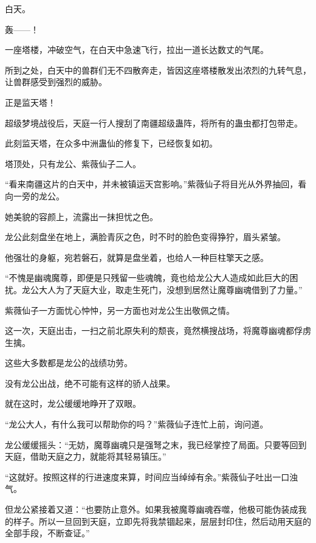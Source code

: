 
\begin{this_body}



白天。

轰——！

一座塔楼，冲破空气，在白天中急速飞行，拉出一道长达数丈的气尾。

所到之处，白天中的兽群们无不四散奔走，皆因这座塔楼散发出浓烈的九转气息，让兽群感受到强烈的威胁。

正是监天塔！

超级梦境战役后，天庭一行人搜刮了南疆超级蛊阵，将所有的蛊虫都打包带走。

此刻监天塔，在众多中洲蛊仙的修复下，已经恢复如初。

塔顶处，只有龙公、紫薇仙子二人。

“看来南疆这片的白天中，并未被镇运天宫影响。”紫薇仙子将目光从外界抽回，看向一旁的龙公。

她美貌的容颜上，流露出一抹担忧之色。

龙公此刻盘坐在地上，满脸青灰之色，时不时的脸色变得狰狞，眉头紧皱。

他强壮的身躯，宛若磐石，就算是盘坐着，也给人一种巨柱擎天之感。

“不愧是幽魂魔尊，即便是只残留一些魂魄，竟也给龙公大人造成如此巨大的困扰。龙公大人为了天庭大业，取走生死门，没想到居然让魔尊幽魂借到了力量。”

紫薇仙子一方面忧心忡忡，另一方面也对龙公生出敬佩之情。

这一次，天庭出击，一扫之前北原失利的颓丧，竟然横搜战场，将魔尊幽魂都俘虏生擒。

这些大多数都是龙公的战绩功劳。

没有龙公出战，绝不可能有这样的骄人战果。

就在这时，龙公缓缓地睁开了双眼。

“龙公大人，有什么我可以帮助你的吗？”紫薇仙子连忙上前，询问道。

龙公缓缓摇头：“无妨，魔尊幽魂只是强弩之末，我已经掌控了局面。只要等回到天庭，借助天庭之力，就能将其轻易镇压。”

“这就好。按照这样的行进速度来算，时间应当绰绰有余。”紫薇仙子吐出一口浊气。

但龙公紧接着又道：“也要防止意外。如果我被魔尊幽魂吞噬，他极可能伪装成我的样子。所以一旦回到天庭，立即先将我禁锢起来，层层封印住，然后动用天庭的全部手段，不断查证。”


\end{this_body}
